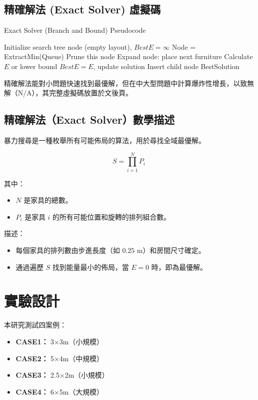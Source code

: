 \documentclass[conference]{IEEEtran}
\begin{document}
\subsection{精確解法 (Exact Solver) 虛擬碼}
\begin{algorithm}[!htbp]
\caption{Exact Solver (Branch and Bound) Pseudocode}
\begin{algorithmic}[1]
\STATE Initialize search tree node (empty layout), \( BestE = \infty \)
    \STATE Node = ExtractMin(Queue)
        \STATE Prune this node
    \ELSE
        \STATE Expand node: place next furniture
            \STATE Calculate \( E \) or lower bound
                    \STATE \( BestE = E \), update solution
                \ENDIF
            \ELSE
                \STATE Insert child node
            \ENDIF
        \ENDFOR
    \ENDIF
\ENDWHILE
\RETURN BestSolution
\end{algorithmic}
\end{algorithm}

精確解法能對小問題快速找到最優解，但在中大型問題中計算爆炸性增長，以致無解（N/A），其完整虛擬碼放置於文後頁。

\subsection{精確解法（Exact Solver）數學描述}
暴力搜尋是一種枚舉所有可能佈局的算法，用於尋找全域最優解。

\[
S = \prod_{i=1}^{N} P_i
\]

其中：
\begin{itemize}
    \item \( N \) 是家具的總數。
    \item \( P_i \) 是家具 \( i \) 的所有可能位置和旋轉的排列組合數。
\end{itemize}

描述：
\begin{itemize}
    \item 每個家具的排列數由步進長度（如 \( 0.25 \) m）和房間尺寸確定。
    \item 通過遍歷 \( S \) 找到能量最小的佈局，當 \( E = 0 \) 時，即為最優解。
\end{itemize}

\FloatBarrier %

\section{實驗設計}
本研究測試四案例：
\begin{itemize}
    \item \textbf{CASE1：} 3×3m（小規模）
    \item \textbf{CASE2：} 5×4m（中規模）
    \item \textbf{CASE3：} 2.5×2m（小規模）
    \item \textbf{CASE4：} 6×5m（大規模）
\end{itemize}
\end{document}
